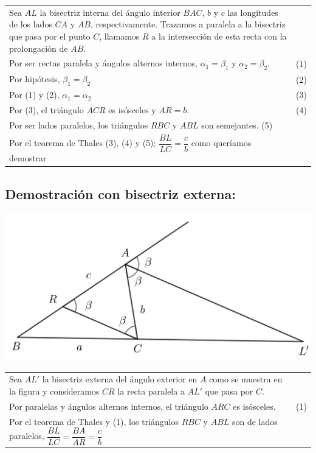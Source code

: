 \documentclass[12pt,a4paper]{article}
\begin{document}
\begin{tabular}{p{15.9 cm} p{1cm}}
Sea $AL$ la bisectriz interna del ángulo interior $BAC$, $b$ y $c$ las longitudes de los lados $CA$ y $AB$, respectivamente. Trazamos a paralela a la bisectriz que pasa por el punto $C$, llamamos $R$ a la intersección de esta recta con la prolongación de $AB$.
\\Por ser rectas paralela y ángulos alternos internos, $\alpha _1= \beta _1$ y $\alpha _2= \beta _2$. &(1)
\\Por hipótesis, $\beta _1= \beta _2$ &(2)
\\Por (1) y (2), $\alpha _1= \alpha _2$&(3)
\\Por (3), el triángulo $ACR$ es isósceles y $AR=b$. &(4)
\\Por ser lados paralelos, los triángulos $RBC$ y $ABL$ son semejantes. (5)
\\Por el teorema de Thales (3), (4) y (5); $\dfrac{BL}{LC} =\dfrac{c}{b}$ como queríamos demostrar
\end{tabular}
\subsection*{Demostración con bisectriz externa:}
\begin{center}
\includegraphics[scale=0.6]{bisectriz_ext.png} 
\end{center}
\begin{tabular}{p{15.9 cm} p{1cm}}
Sea $AL'$ la bisectriz externa del ángulo exterior en $A$ como se muestra en la figura y consideramos $CR$ la recta paralela a $AL'$ que pasa por $C$.
\\Por paralelas y ángulos alternos internos, el triángulo $ARC$ es isósceles. &(1)
\\Por el teorema de Thales y (1), los triángulos $RBC$ y $ABL$ son de lados paralelos, $\dfrac{BL}{LC}=\dfrac{BA}{AR}=\dfrac{c}{b}$
\end{tabular}
\end{document}
